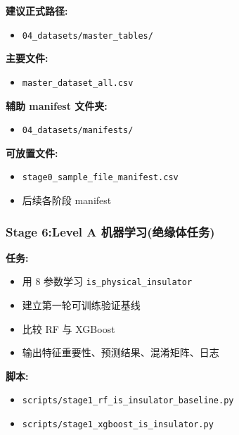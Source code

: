 \documentclass[lang=cn,scheme=chinese,color=blue,device=normal,toc=onecol,math=cm]{elegantbook}
\begin{document}
\textbf{建议正式路径:}\par


\begin{itemize}
\item \texttt{04\_\allowbreak{}datasets/\allowbreak{}master\_\allowbreak{}tables/\allowbreak{}}
\end{itemize}


\textbf{主要文件:}\par


\begin{itemize}
\item \texttt{master\_\allowbreak{}dataset\_\allowbreak{}all.csv}
\end{itemize}


\textbf{辅助 manifest 文件夹:}\par


\begin{itemize}
\item \texttt{04\_\allowbreak{}datasets/\allowbreak{}manifests/\allowbreak{}}
\end{itemize}


\textbf{可放置文件:}\par


\begin{itemize}
\item \texttt{stage0\_\allowbreak{}sample\_\allowbreak{}file\_\allowbreak{}manifest.csv}
\item 后续各阶段 manifest
\end{itemize}


\subsubsection{Stage 6:Level A 机器学习(绝缘体任务)}


\textbf{任务:}\par


\begin{itemize}
\item 用 8 参数学习 \texttt{is\_\allowbreak{}physical\_\allowbreak{}insulator}
\item 建立第一轮可训练验证基线
\item 比较 RF 与 XGBoost
\item 输出特征重要性、预测结果、混淆矩阵、日志
\end{itemize}


\textbf{脚本:}\par


\begin{itemize}
\item \texttt{scripts/\allowbreak{}stage1\_\allowbreak{}rf\_\allowbreak{}is\_\allowbreak{}insulator\_\allowbreak{}baseline.py}
\item \texttt{scripts/\allowbreak{}stage1\_\allowbreak{}xgboost\_\allowbreak{}is\_\allowbreak{}insulator.py}
\end{itemize}
\end{document}
